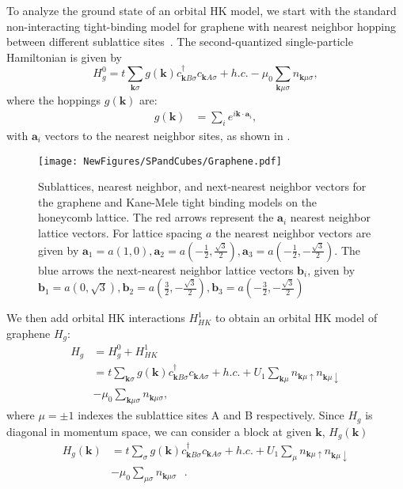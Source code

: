 \documentclass[prb,aps,amssymb,twocolumn,notitlepage]{revtex4-2}
\begin{document}
To analyze the ground state of an orbital HK model, we start with the standard non-interacting tight-binding model for graphene with nearest neighbor hopping between different sublattice sites~\cite{semenoff1984condensedmatter}. 
The second-quantized single-particle Hamiltonian is given by
\begin{equation}
H^{0}_{g}=t\sum_{\mathbf{k}\sigma}g(\mathbf{k})c^\dagger_{\mathbf{k}B\sigma}c_{\mathbf{k}A\sigma}+h.c.-\mu_{0}\sum_{\mathbf{k}\mu\sigma}n_{\mathbf{k}\mu\sigma},
\end{equation}
where the hoppings $g(\mathbf{k})$ are:
\begin{align}
g(\mathbf{k})&=\sum_{i}e^{i\mathbf{k}\cdot\mathbf{a}_i},
\end{align}
with $\mathbf{a}_i$ vectors to the nearest neighbor sites, as shown in .
\begin{figure}[ht]
\texttt{[image: NewFigures/SPandCubes/Graphene.pdf]}
\caption{Sublattices, nearest neighbor, and next-nearest neighbor vectors for the graphene and Kane-Mele tight binding models on the honeycomb lattice. 
The red arrows represent the $\mathbf{a}_{i}$ nearest neighbor lattice vectors. 
For lattice spacing $a$ the nearest neighbor vectors are given by $\mathbf{a}_1=a(1,0),\mathbf{a}_2=a(-\tfrac{1}{2},\tfrac{\sqrt{3}}{2}),\mathbf{a}_3=a(-\tfrac{1}{2},-\tfrac{\sqrt{3}}{2})$. 
The blue arrows the next-nearest neighbor lattice vectors $\mathbf{b}_i$, given by $\mathbf{b}_1=a(0,\sqrt{3}), \mathbf{b}_2=a(\tfrac{3}{2},-\tfrac{\sqrt{3}}{2}), \mathbf{b}_3=a(-\tfrac{3}{2},-\tfrac{\sqrt{3}}{2})$}
\label{fig:graphene}
\end{figure}

We then add orbital HK interactions $H^{1}_{HK}$ to obtain an orbital HK model of graphene $H_{g}$:
\begin{align}
\label{eq:grapheneH}
H_{g}&=H^{0}_{g}+H^{1}_{HK} \\
&=t\sum_{\mathbf{k}\sigma}g(\mathbf{k})c^\dagger_{\mathbf{k}B\sigma}c_{\mathbf{k}A\sigma}+h.c.+U_{1}\sum_{\mathbf{k}\mu}n_{\mathbf{k}\mu\uparrow}n_{\mathbf{k}\mu\downarrow} \nonumber \\
&-\mu_0\sum_{\mathbf{k}\mu\sigma}n_{\mathbf{k}\mu\sigma}, \nonumber
\end{align}
where $\mu=\pm 1$ indexes the sublattice sites A and B respectively. 
 Since $H_{g}$ is diagonal in momentum space, we can consider a block at given $\mathbf{k}$,  $H_{g}(\mathbf{k})$
\begin{align}\label{eq:graphenekblockham}
H_{g}(\mathbf{k})&=t\sum_{\sigma}g(\mathbf{k})c^\dagger_{\mathbf{k}B\sigma}c_{\mathbf{k}A\sigma}+h.c.+U_{1}\sum_{\mu}n_{\mathbf{k}\mu\uparrow}n_{\mathbf{k}\mu\downarrow} \\
&-\mu_{0}\sum_{\mu\sigma}n_{\mathbf{k}\mu\sigma}\text{ }. \nonumber
\end{align}
\end{document}
